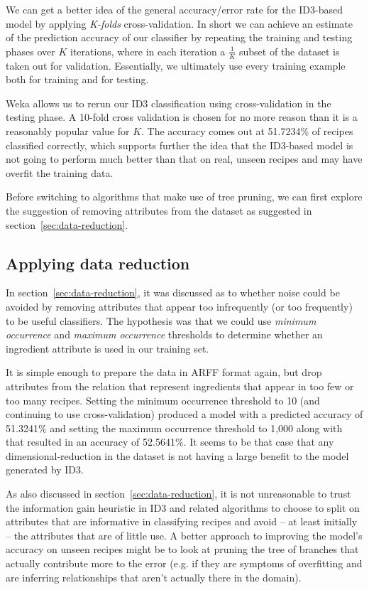 \documentclass[11pt,a4paper]{article}
\begin{document}
We can get a better idea of the general accuracy/error rate for the ID3-based model
by applying \emph{K-folds} cross-validation. In short we can achieve an estimate of
the prediction accuracy of our classifier by repeating the training and testing
phases over $K$ iterations, where in each iteration a $\frac{1}{K}$ subset of the dataset
is taken out for validation. Essentially, we ultimately use every training example
both for training and for testing.

Weka allows us to rerun our ID3 classification using cross-validation in the testing
phase. A 10-fold cross validation is chosen for no more reason than it is a reasonably
popular value for $K$. \cite{mclachlan2005analyzing} The accuracy comes out at
51.7234\% of recipes classified correctly, which supports further the idea that
the ID3-based model is not going to perform much better than that on real, unseen
recipes and may have overfit the training data.

Before switching to algorithms that make use of tree pruning, we can first explore the
suggestion of removing attributes from the dataset as suggested in
section~\ref{sec:data-reduction}.

\subsection{Applying data reduction}

In section~\ref{sec:data-reduction}, it was discussed as to whether noise could be
avoided by removing attributes that appear too infrequently (or too frequently) to be
useful classifiers. The hypothesis was that we could use \emph{minimum occurrence} and
\emph{maximum occurrence} thresholds to determine whether an ingredient attribute
is used in our training set.

It is simple enough to prepare the data in ARFF format again, but drop attributes from
the relation that represent ingredients that appear in too few or too many recipes.
Setting the minimum occurrence threshold to 10 (and continuing to use cross-validation)
produced a model with a predicted accuracy of 51.3241\% and setting the maximum
occurrence threshold to 1,000 along with that resulted in an accuracy of 52.5641\%. It
seems to be that case that any dimensional-reduction in the dataset is not having a
large benefit to the model generated by ID3.

As also discussed in section~\ref{sec:data-reduction}, it is not unreasonable
to trust the information gain heuristic in ID3 and related algorithms to choose
to split on attributes that are informative in classifying recipes and avoid
-- at least initially -- the attributes that are of little use. A better
approach to improving the model's accuracy on unseen recipes might be
to look at pruning the tree of branches that actually contribute more to the error
(e.g. if they are symptoms of overfitting and are inferring relationships that
aren't actually there in the domain).
\end{document}
